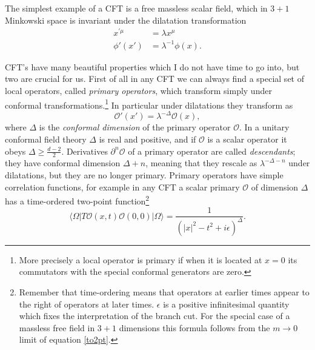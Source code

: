 \documentclass[12pt]{article}
\newcommand{\be}{\begin{equation}}
\newcommand{\ee}{\end{equation}}
\newcommand{\lan}{\langle}
\newcommand{\ran}{\rangle}
\begin{document}
The simplest example of a CFT is a free massless scalar field, which in $3+1$ Minkowski space is invariant under the dilatation transformation
\begin{align}\nonumber
x^{'\mu}&=\lambda x^\mu\\
\phi'(x')&=\lambda^{-1} \phi(x).
\end{align}

CFT's have many beautiful properties which I do not have time to go into, but two are crucial for us.  First of all in any CFT we can always find a special set of local operators, called \textit{primary operators}, which transform simply under conformal transformations.\footnote{More precisely a local operator is primary if when it is located at $x=0$ its commutators with the special conformal generators are zero.}  In particular under dilatations they transform as
\be
\mathcal{O}'(x')=\lambda^{-\Delta}\mathcal{O}(x),
\ee
where $\Delta$ is the \textit{conformal dimension} of the primary operator $\mathcal{O}$.  In a unitary conformal field theory $\Delta$ is real and positive, and if $\mathcal{O}$ is a scalar operator it obeys $\Delta\geq\frac{d-2}{2}$.  Derivatives $\partial^n\mathcal{O}$ of a primary operator are called \textit{descendants}; they have conformal dimension $\Delta+n$, meaning that they rescale as $\lambda^{-\Delta-n}$ under dilatations, but they are no longer primary.  Primary operators have simple correlation functions, for example in any CFT a scalar primary $\mathcal{O}$ of dimension $\Delta$ has a time-ordered two-point function\footnote{Remember that time-ordering means that operators at earlier times appear to the right of operators at later times.  $\epsilon$ is a positive infinitesimal quantity which fixes the interpretation of the branch cut.  For the special case of a massless free field in $3+1$ dimensions this formula follows from the $m\to 0$ limit of equation \eqref{to2pt}.}
\be\label{cft2pt}
\lan\Omega|T\mathcal{O}(x,t)\mathcal{O}(0,0)|\Omega\ran=\frac{1}{(|x|^2-t^2+i\epsilon)^\Delta}.
\ee
\end{document}
